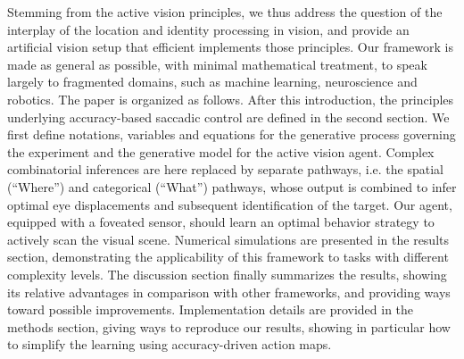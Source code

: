 Stemming from the active vision principles, we thus address the question of the
interplay of the location and identity processing in vision,
and provide an artificial vision setup that efficient implements those principles.
Our framework is made as general as possible, with minimal mathematical treatment, to speak largely to fragmented domains, such as machine learning, neuroscience and robotics.
The paper is organized as follows.
After this introduction, the principles underlying accuracy-based saccadic control are defined in the second section. {\color{magenta} We first define notations, variables and equations for the generative process governing the experiment and the generative model for the active vision agent.}
Complex combinatorial inferences are here replaced by separate pathways, i.e. the spatial (``Where'') and categorical (``What'') pathways, whose output is combined to infer optimal eye displacements and subsequent identification of the target. Our agent, equipped with a foveated sensor, should learn an optimal behavior strategy to actively scan the visual scene. Numerical simulations are presented in the results section, demonstrating the applicability of this framework to tasks with different complexity levels. %
The discussion section finally summarizes the results, showing its relative advantages in comparison with other frameworks, and providing ways toward possible improvements.
Implementation details are provided in the methods section, giving ways to reproduce our results, showing in particular how to simplify the learning using accuracy-driven action maps.


